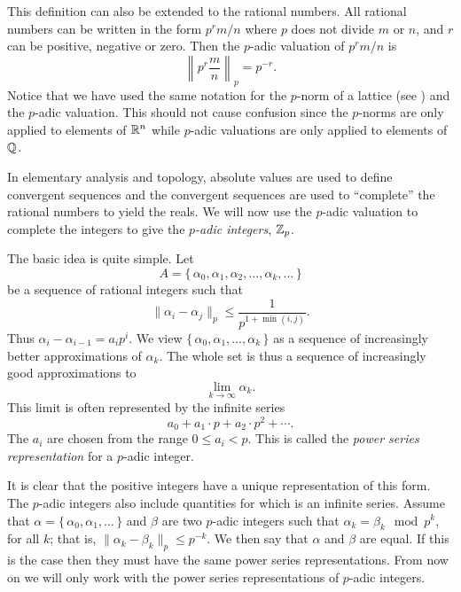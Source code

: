 This definition can also be extended to the rational numbers.  All
rational numbers can be written in the form $p^r m/n$ where $p$ does
not divide $m$ or $n$, and $r$ can be positive, negative or zero.
Then the $p$-adic valuation of $p^r m/n$ is
\[
\left\| p^r \frac{m}{n} \right\|_p = p^{-r}.
\]
Notice that we have used the same notation for the $p$-norm of a
lattice (see ) and the $p$-adic valuation.
This should not cause confusion since the $p$-norms are only applied
to elements of $\mathbb{R}^n$ while $p$-adic valuations are only applied to
elements of $\mathbb{Q}$.

\smallskip
In elementary analysis and topology, absolute values are used to define
convergent sequences and the convergent sequences are used to ``complete''
the rational numbers to yield the reals.  We will now use the $p$-adic
valuation to complete the integers to give the {\em $p$-adic
integers},
$\mathbb{Z}_p$.

The basic idea is quite simple.  Let
\[
A = \{\,\alpha_0, \alpha_1, \alpha_2, \ldots, \alpha_k, \ldots\,\}
\]
be a sequence of rational integers such that
\[
\| \alpha_i - \alpha_j \|_p \le \frac{1}{p^{1+\min (i,j)}}.
\]
Thus $\alpha_i - \alpha_{i-1} = a_i p^i$.  We view $\{\,\alpha_0,
\alpha_1, \ldots, \alpha_k\,\}$ as a sequence of increasingly better
approximations of $\alpha_k$.  The whole set is thus a sequence of
increasingly good approximations to
\[
\lim_{k \rightarrow \infty} \alpha_k.
\]
This limit is often represented by the infinite series
\begin{equation}
a_0 + a_1 \cdot p + a_2 \cdot p^2 + \cdots.
\label{PSeries:Eq}
\end{equation}
The $a_i$ are chosen from the range
$0 \le a_i < p$.  This is called the {\em power series representation} for a
$p$-adic integer.

It is clear that the positive integers have a unique representation of this
form.  The $p$-adic integers also include quantities for which
 is an infinite series.  Assume that
$\alpha = \{\,\alpha_0, \alpha_1, \ldots\,\}$ and $\beta$ are two
$p$-adic integers such that $\alpha_k = \beta_k \mod{p^k}$, for all
$k$; that is, $\| \alpha_k - \beta_k \|_p \le p^{-k}$.  We then say
that $\alpha$ and $\beta$ are equal.  If this is the case then they
must have the same power series representations.  From now on we will
only work with the power series representations of $p$-adic integers.

